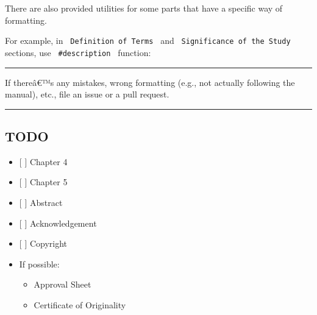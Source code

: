 There are also provided utilities for some parts that have a specific
way of formatting.

For example, in \texttt{\ Definition\ of\ Terms\ } and
\texttt{\ Significance\ of\ the\ Study\ } sections, use
\texttt{\ \#description\ } function:

\begin{Shaded}
\begin{Highlighting}[]
\NormalTok{  (}
\NormalTok{  )}
\NormalTok{)}


\NormalTok{  (}
\NormalTok{  )}
\NormalTok{)}
\end{Highlighting}
\end{Shaded}

\begin{center}\rule{0.5\linewidth}{0.5pt}\end{center}

If thereâ€™s any mistakes, wrong formatting (e.g., not actually
following the manual), etc., file an issue or a pull request.

\begin{center}\rule{0.5\linewidth}{0.5pt}\end{center}

\subsection{TODO}\label{todo}

\begin{itemize}
\tightlist
\item
  {[} {]} Chapter 4
\item
  {[} {]} Chapter 5
\item
  {[} {]} Abstract
\item
  {[} {]} Acknowledgement
\item
  {[} {]} Copyright
\item
  If possible:

  \begin{itemize}
  \tightlist
  \item
    Approval Sheet
  \item
    Certificate of Originality
  \end{itemize}
\end{itemize}

